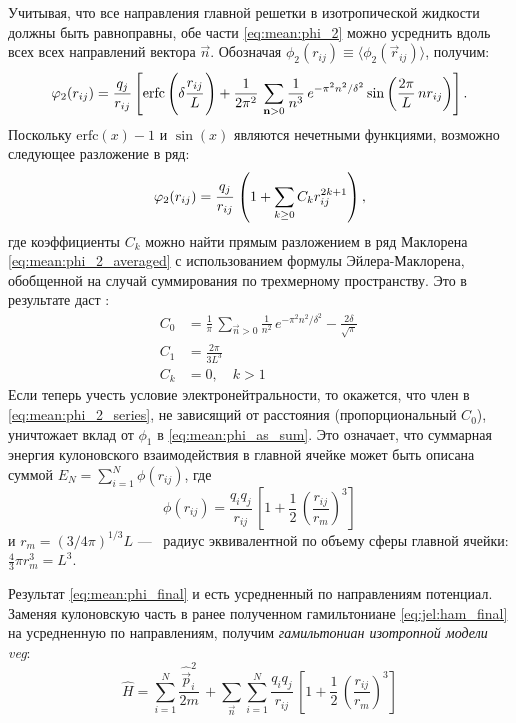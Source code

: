 Учитывая, что все направления главной решетки в изотропической жидкости должны быть равноправны, обе части \eqref{eq:mean:phi_2} можно усреднить вдоль всех всех направлений вектора $\vec{n}$.
Обозначая $\phi_2 (r_{ij}) \equiv \langle \phi_2 (\vec{r}_{ij}) \rangle$, получим:
\begin{equation}
    \label{eq:mean:phi_2_averaged}
    \phi_2 (r_{ij}) = \frac{q_{j}}{r_{ij}} \left[ \mathrm{erfc} \left( \delta \cfrac{r_{ij}}{L}\, \right) + \frac{1}{2\pi^2}\, \sum\limits_{\vec{n} > 0}^{} \frac{1}{n^3}\, e^{-\pi^2 n^2 / \delta^2} \sin \left( \frac{2\pi}{L}\, n r_{ij} \right) \right].
\end{equation}
Поскольку $\mathrm{erfc}(x) - 1$ и $\sin (x)$ являются нечетными функциями, возможно следующее разложение в ряд:
\begin{equation}
    \label{eq:mean:phi_2_series}
    \phi_2 (r_{ij}) = \cfrac{q_{j}}{r_{ij}}\, \left( 1 + \sum\limits_{k \geq 0}^{} C_{k} r_{ij}^{2k+1} \right),
\end{equation}
где коэффициенты $C_k$ можно найти прямым разложением в ряд Маклорена \eqref{eq:mean:phi_2_averaged} с использованием формулы Эйлера-Маклорена, обобщенной на случай суммирования по трехмерному пространству.
Это в результате даст \cite{jel:pre-averaged_summation}:
\begin{equation}
    \label{eq:mean:C_coeffs}
    \begin{aligned}
        C_0 &= \frac{1}{\pi}\, \sum\limits_{\vec{n} > 0}^{} \frac{1}{n^2}\, e^{-\pi^2 n^2 / \delta^2} - \frac{2\delta}{\sqrt{\pi}}\, \\
        C_1 &= \frac{2\pi}{3 L^3}\, \\
        C_k &= 0, \quad k > 1
    \end{aligned}
\end{equation}
Если теперь учесть условие электронейтральности, то окажется, что член в \eqref{eq:mean:phi_2_series}, не зависящий от расстояния (пропорциональный $C_0$), уничтожает вклад от $\phi_1$ в \eqref{eq:mean:phi_as_sum}.
Это означает, что суммарная энергия кулоновского взаимодействия в главной ячейке может быть описана суммой $E_N = \sum_{i=1}^N \phi (r_{ij})$, где
\begin{equation}
    \label{eq:mean:phi_final}
    \phi (r_{ij}) = \frac{q_i q_j}{r_{ij}}\, \left[ 1 + \frac{1}{2}\, \left( \frac{r_{ij}}{r_{m}} \right)^3 \right]
\end{equation}
и $r_{m} = (3 / 4 \pi)^{1 / 3} L$ ---~ радиус эквивалентной по объему сферы главной ячейки: $\frac{4}{3} \pi r_{m}^3 = L^3$.

Результат \eqref{eq:mean:phi_final} и есть усредненный по направлениям потенциал.
Заменяя кулоновскую часть в ранее полученном гамильтониане \eqref{eq:jel:ham_final} на усредненную по направлениям, получим \textit{гамильтониан изотропной модели \acrshort{veg}}:
\begin{equation}
    \label{eq:mean:ham_final}
    \hat{H} = \sum\limits_{i=1}^{N} \frac{\hat{\vec{p}}_{i}^2}{2m}\, + \sum\limits_{\vec{n}}^{} \sum\limits_{i=1}^{N} \frac{q_{i} q_{j} }{r_{ij} }\, \left[ 1 + \frac{1}{2}\, \left( \frac{r_{ij} }{r_{m} } \right)^3 \right]
\end{equation}
